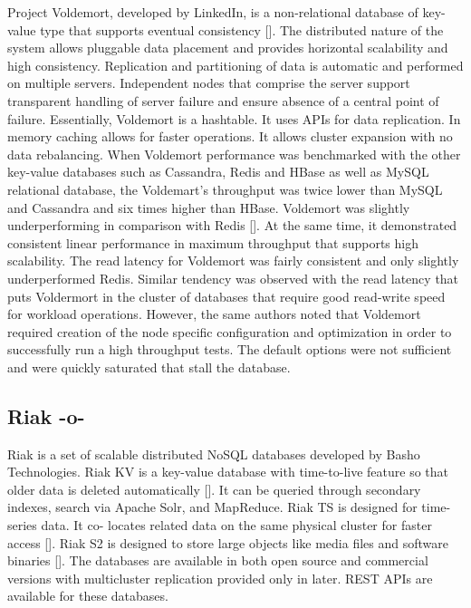 Project Voldemort, developed by LinkedIn, is a non-relational database
of key-value type that supports eventual
consistency [\cite{www-voldemort}].  The distributed nature of the
system allows pluggable data placement and provides horizontal
scalability and high consistency. Replication and partitioning of data
is automatic and performed on multiple servers. Independent nodes that
comprise the server support transparent handling of server failure and
ensure absence of a central point of failure. Essentially, Voldemort
is a hashtable. It uses APIs for data replication. In memory caching
allows for faster operations. It allows cluster expansion with no data
rebalancing.  When Voldemort performance was benchmarked with the
other key-value databases such as Cassandra, Redis and HBase as well
as MySQL relational database, the Voldemart's throughput was twice
lower than MySQL and Cassandra and six times higher than
HBase. Voldemort was slightly underperforming in comparison with
Redis [\cite{rabl-sadoghi-jacobsen-2012}].  At the same time, it
demonstrated consistent linear performance in maximum throughput that
supports high scalability. The read latency for Voldemort was fairly
consistent and only slightly underperformed Redis. Similar tendency
was observed with the read latency that puts Voldermort in the cluster
of databases that require good read-write speed for workload
operations. However, the same authors noted that Voldemort required
creation of the node specific configuration and optimization in order
to successfully run a high throughput tests. The default options were
not sufficient and were quickly saturated that stall the database.


     
\subsection{Riak -o-}

Riak is a set of scalable distributed NoSQL databases developed by
Basho Technologies. Riak KV is a key-value database with time-to-live
feature so that older data is deleted
automatically [\cite{www-riak-kv}].  It can be queried through secondary
indexes, search via Apache Solr, and MapReduce. Riak TS is designed
for time-series data. It co- locates related data on the same physical
cluster for faster access [\cite{www-riak-ts}]. Riak S2 is designed to
store large objects like media files and software
binaries [\cite{www-riak-s2}]. The databases are available in both open
source and commercial versions with multicluster replication provided
only in later. REST APIs are available for these databases.



